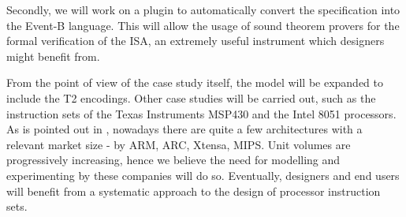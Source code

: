 \documentclass[conference]{IEEEtran}
\begin{document}
Secondly, we will work on a plugin to automatically convert the specification into the
Event-B language. This will allow the usage of sound theorem provers for the formal
verification of the ISA, an extremely useful instrument which designers might benefit from.

From the point of view of the case study itself, the model will be expanded to include the
T2 encodings. Other case studies will be carried out, such as the instruction
sets of the Texas Instruments MSP430 and the Intel 8051 processors. As is pointed out in
\cite{webArticle}, nowadays there are quite a few architectures with a relevant market size -
by ARM, ARC, Xtensa, MIPS. Unit volumes are progressively increasing, hence we believe the
need for modelling and experimenting by these companies will do so. Eventually, designers and
end users will benefit from a systematic approach to the design of processor instruction sets.

\end{document}
